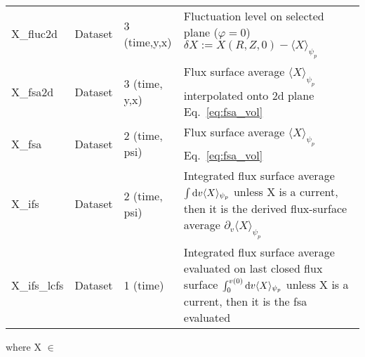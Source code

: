 \begin{longtable}{lll>{\RaggedRight}p{7cm}}
X\_fluc2d        & Dataset & 3 (time,y,x) & Fluctuation level on selected plane ($\varphi= 0$) $\delta X := X(R,Z,0) - \langle X\rangle_{\psi_{p}}$ \\
X\_fsa2d         & Dataset & 3 (time, y,x) & Flux surface average $\langle X\rangle_{\psi_p}$ interpolated onto 2d plane Eq.~\eqref{eq:fsa_vol} \\
X\_fsa           & Dataset & 2 (time, psi) & Flux surface average $\langle X\rangle_{\psi_p}$ Eq.~\eqref{eq:fsa_vol} \\
X\_ifs           & Dataset & 2 (time, psi) & Integrated flux surface average $\int\mathrm{d} v\langle X\rangle_{\psi_p}$ unless X is a current, then it is the derived flux-surface average $\partial_v \langle X\rangle_{\psi_p}$ \\
X\_ifs\_lcfs     & Dataset & 1 (time) & Integrated flux surface average evaluated on last closed flux surface $\int_0^{v(0)}\mathrm{d} v\langle X\rangle_{\psi_p}$ unless X is a current, then it is the fsa evaluated \\
\bottomrule
\end{longtable}
where X $\in$

